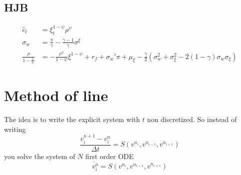\documentclass[english]{article}
\begin{document}
\subsection{HJB}
\begin{align*}
	\hat{c}_t&=\xi_t^{1-\psi}\rho^\psi\\
	\sigma_w &= \frac{\pi}{\gamma} - \frac{\gamma-1}{\gamma}\sigma^\xi\\
	\frac{\rho}{1-\frac{1}{\psi}}&=  -\frac{\rho^\psi}{1-\psi}\xi^{1-\psi}  +r_f + \sigma_w'\pi +\mu_{\xi}-\frac{\gamma}{2}( \sigma^2_w +\sigma^2_\xi -2(1-\gamma)\sigma_w\sigma_\xi)
\end{align*}

\section{Method of line}
The idea is to write the explicit system with $t$ non discretized. So instead of writing
$$\frac{v^{n+1}_i -v^{n}_i}{\Delta t} = S(v^{n_i},v^{n_{i-1}},v^{n_{i+1}})$$
you solve the system of $N$ first order ODE
$$\dot{v_i^n} =  S(v^{n_i},v^{n_{i-1}},v^{n_{i+1}})$$
\end{document}
